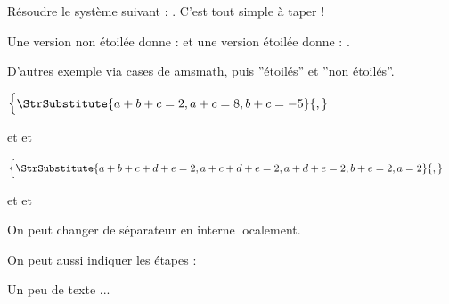 \documentclass[a4paper,11pt]{article}
\newcommand\simpleSysteme[2][,]{%
		\begingroup\noexpandarg
			\ensuremath{%
				\begin{cases}
					\StrSubstitute{#2}{#1}\\
				\end{cases}%
			}%
		\endgroup%
	}
\begin{document}
	Résoudre le système suivant :
		.
	C'est tout simple à taper !


	Une version non étoilée donne : 
	et une version étoilée donne : 
		.


	D'autres exemple via cases de amsmath, puis ''étoilés'' et ''non étoilés''.

		\simpleSysteme{
			a+b+c = 2,
			a+c = 8,
			b+c = -5
		}
	et
	et

		\simpleSysteme{
			a+b+c+d+e = 2,
			a+c+d+e = 2,
			a+d+e = 2,
			b+e = 2,
			a = 2
		}
	et
	et


		On peut changer de séparateur en interne localement.

	\syseqsep{\\}

	On peut aussi indiquer les étapes : 


	\syscodeextracol{\kern2.5em }{}
	\sysextracolsign{|}

	Un peu de texte ...
\end{document}
